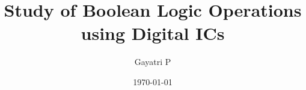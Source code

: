 \documentclass[reprint,amsmath,amssymb,aps]{revtex4-2}
\begin{document}
    \title{Study of Boolean Logic Operations using Digital ICs}

    \author{Gayatri P}
    \date{\today}

    
    \maketitle

    
    
    
    

    
    \nocite{*}
\end{document}
